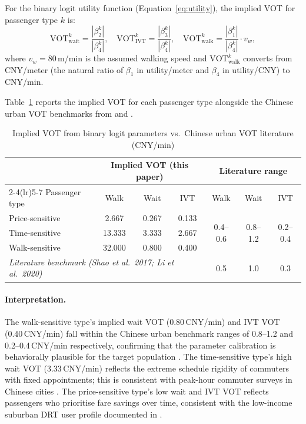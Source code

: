 For the binary logit utility function (Equation~\ref{eq:utility}), the implied VOT for
passenger type $k$ is:
\begin{equation}\label{eq:vot-formula}
  \text{VOT}_{\text{wait}}^k = \frac{|\beta_2^k|}{|\beta_4^k|}, \quad
  \text{VOT}_{\text{IVT}}^k  = \frac{|\beta_3^k|}{|\beta_4^k|}, \quad
  \text{VOT}_{\text{walk}}^k = \frac{|\beta_1^k|}{|\beta_4^k|} \cdot v_w,
\end{equation}
where $v_w = 80$\,m/min is the assumed walking speed and
$\text{VOT}_{\text{walk}}^k$ converts from CNY/meter (the natural ratio
of $\beta_1$ in utility/meter and $\beta_4$ in utility/CNY) to CNY/min.

Table~\ref{tab:vot-mapping} reports the implied VOT for each passenger type
alongside the Chinese urban VOT benchmarks from \citet{shao2017} and
\citet{li2020drt}.

\begin{table}[h]
\centering
\caption{Implied VOT from binary logit parameters vs.\ Chinese urban VOT literature (CNY/min)}
\label{tab:vot-mapping}
\begin{tabular}{lcccccc}
\toprule
 & \multicolumn{3}{c}{Implied VOT (this paper)} & \multicolumn{3}{c}{Literature range} \\
\cmidrule(lr){2-4}\cmidrule(lr){5-7}
Passenger type & Walk & Wait & IVT & Walk & Wait & IVT \\
\midrule
Price-sensitive  & 2.667 & 0.267 & 0.133 & \multirow{3}{*}{0.4--0.6} & \multirow{3}{*}{0.8--1.2} & \multirow{3}{*}{0.2--0.4} \\
Time-sensitive   & 13.333 & 3.333 & 2.667 & & & \\
Walk-sensitive   & 32.000 & 0.800 & 0.400 & & & \\
\midrule
\multicolumn{4}{l}{\textit{Literature benchmark (Shao et al.\ 2017; Li et al.\ 2020)}} & 0.5 & 1.0 & 0.3 \\
\bottomrule
\end{tabular}
\end{table}

\paragraph{Interpretation.}
The walk-sensitive type's implied wait VOT (0.80\,CNY/min) and IVT VOT
(0.40\,CNY/min) fall within the Chinese urban benchmark ranges of 0.8--1.2
and 0.2--0.4\,CNY/min respectively, confirming that the parameter calibration
is behaviorally plausible for the target population \citep{shao2017,li2020drt}.
The time-sensitive type's high wait VOT (3.33\,CNY/min) reflects the extreme
schedule rigidity of commuters with fixed appointments; this is consistent with
peak-hour commuter surveys in Chinese cities \citep{shao2017}.
The price-sensitive type's low wait and IVT VOT reflects passengers who
prioritise fare savings over time, consistent with the low-income suburban
DRT user profile documented in \citet{li2020drt}.

